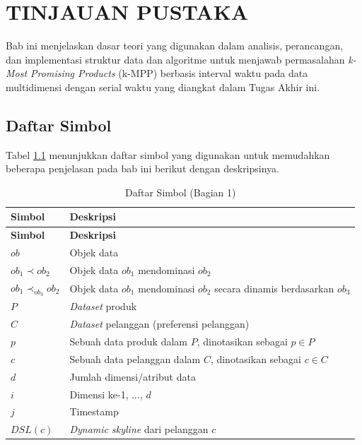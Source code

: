 
\chapter{TINJAUAN PUSTAKA} \label{chapter:tinjauan pustaka}
\tab Bab ini menjelaskan dasar teori yang digunakan dalam analisis, perancangan, dan implementasi struktur data dan algoritme untuk menjawab permasalahan \textit{k-Most Promising Products} (k-MPP) berbasis interval waktu pada data multidimensi dengan serial waktu yang diangkat dalam Tugas Akhir ini. 

\section{Daftar Simbol}
\tab Tabel \ref{tabel:daftar-simbol-bag1} menunjukkan daftar simbol yang digunakan untuk memudahkan beberapa penjelasan pada bab ini berikut dengan deskripsinya.

\begin{longtable}{| p{2cm} | p{7cm} |} 
	\caption{Daftar Simbol (Bagian 1) \label{tabel:daftar-simbol-bag1}}\\
	\hline
	\multicolumn{1}{|p{2cm}|}{\textbf{Simbol}} & \multicolumn{1}{|p{7cm}|}{\textbf{Deskripsi}}\\ \hline
	\hline
	\endfirsthead
	\hline
	\multicolumn{1}{|p{2cm}|}{\textbf{Simbol}} & \multicolumn{1}{|p{7cm}|}{\textbf{Deskripsi}}\\ \hline 
	\endhead
	$ob$ & Objek data\\ \hline
	$ob_1 \prec ob_2$ & Objek data $ob_1$ mendominasi $ob_2$\\ \hline
	$ob_1 \prec_{ob_3} ob_2$ & Objek data $ob_1$ mendominasi $ob_2$ secara dinamis berdasarkan $ob_3$\\ \hline
	$P$ & \textit{Dataset} produk\\ \hline
	$C$ & \textit{Dataset} pelanggan (preferensi pelanggan)\\ \hline
	$p$ & Sebuah data produk dalam $P$, dinotasikan sebagai $p \in P$\\ \hline
	$c$ & Sebuah data pelanggan dalam $C$, dinotasikan sebagai $c \in C$\\ \hline
	$d$ & Jumlah dimensi/atribut data\\ \hline
	$i$ & Dimensi ke-1, ..., $d$\\ \hline
	$j$ & Timestamp\\ \hline
	$DSL(c)$ & \textit{Dynamic skyline} dari pelanggan $c$\\ \hline
\end{longtable}

